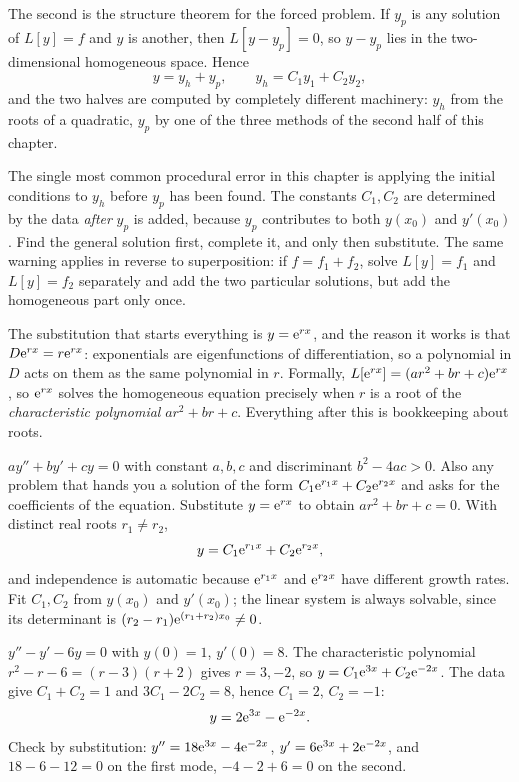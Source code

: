 The second is the structure theorem for the forced problem. If $y_p$ is any solution of $L[y]=f$ and $y$ is another, then $L[y-y_p]=0$, so $y-y_p$ lies in the two-dimensional homogeneous space. Hence
\[y=y_h+y_p,\qquad y_h=C_1y_1+C_2y_2,\]
and the two halves are computed by completely different machinery: $y_h$ from the roots of a quadratic, $y_p$ by one of the three methods of the second half of this chapter.

\begin{keynote}
The single most common procedural error in this chapter is applying the initial conditions to $y_h$ before $y_p$ has been found. The constants $C_1,C_2$ are determined by the data \emph{after} $y_p$ is added, because $y_p$ contributes to both $y(x_0)$ and $y'(x_0)$. Find the general solution first, complete it, and only then substitute. The same warning applies in reverse to superposition: if $f=f_1+f_2$, solve $L[y]=f_1$ and $L[y]=f_2$ separately and add the two particular solutions, but add the homogeneous part only once.
\end{keynote}

The substitution that starts everything is $y=\mathrm{e}^{rx}$, and the reason it works is that $D\mathrm{e}^{rx}=r\mathrm{e}^{rx}$: exponentials are eigenfunctions of differentiation, so a polynomial in $D$ acts on them as the same polynomial in $r$. Formally, $L[\mathrm{e}^{rx}]=(ar^{2}+br+c)\mathrm{e}^{rx}$, so $\mathrm{e}^{rx}$ solves the homogeneous equation precisely when $r$ is a root of the \emph{characteristic polynomial} $ar^{2}+br+c$. Everything after this is bookkeeping about roots.

\cue $ay''+by'+cy=0$ with constant $a,b,c$ and discriminant $b^{2}-4ac>0$. Also any problem that hands you a solution of the form $C_1\mathrm{e}^{r_1x}+C_2\mathrm{e}^{r_2x}$ and asks for the coefficients of the equation.
\method Substitute $y=\mathrm{e}^{rx}$ to obtain $ar^{2}+br+c=0$. With distinct real roots $r_1\ne r_2$,
\[y=C_1\mathrm{e}^{r_1x}+C_2\mathrm{e}^{r_2x},\]
and independence is automatic because $\mathrm{e}^{r_1x}$ and $\mathrm{e}^{r_2x}$ have different growth rates. Fit $C_1,C_2$ from $y(x_0)$ and $y'(x_0)$; the linear system is always solvable, since its determinant is $(r_2-r_1)\mathrm{e}^{(r_1+r_2)x_0}\ne0$.

\begin{worked}
$y''-y'-6y=0$ with $y(0)=1$, $y'(0)=8$. The characteristic polynomial $r^{2}-r-6=(r-3)(r+2)$ gives $r=3,-2$, so $y=C_1\mathrm{e}^{3x}+C_2\mathrm{e}^{-2x}$. The data give $C_1+C_2=1$ and $3C_1-2C_2=8$, hence $C_1=2$, $C_2=-1$:
\[y=2\mathrm{e}^{3x}-\mathrm{e}^{-2x}.\]
Check by substitution: $y''=18\mathrm{e}^{3x}-4\mathrm{e}^{-2x}$, $y'=6\mathrm{e}^{3x}+2\mathrm{e}^{-2x}$, and $18-6-12=0$ on the first mode, $-4-2+6=0$ on the second.
\end{worked}

